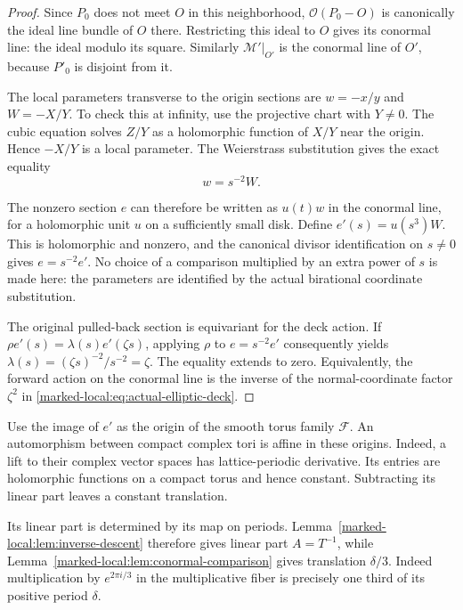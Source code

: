 \begin{proof}
Since $P_0$ does not meet $O$ in this neighborhood,
$\mathcal O(P_0-O)$ is canonically the ideal line bundle of $O$
there. Restricting this ideal to $O$ gives its conormal line:
the ideal modulo its square. Similarly $\mathcal M'|_{O'}$ is
the conormal line of $O'$, because $P'_0$ is disjoint from it.

The local parameters transverse to the origin sections are
$w=-x/y$ and $W=-X/Y$. To check this at infinity, use the projective chart with $Y\ne0$.
The cubic equation solves $Z/Y$ as a holomorphic function of $X/Y$
near the origin. Hence $-X/Y$ is a local parameter. The Weierstrass substitution gives the
exact equality
\begin{equation}\label{marked-local:eq:conormal-coordinate}
                         w=s^{-2}W.
\end{equation}

The nonzero section $e$ can therefore be written as $u(t)w$ in
the conormal line, for a holomorphic unit $u$ on a sufficiently
small disk. Define $e'(s)=u(s^3)W$. This is holomorphic and
nonzero, and the canonical divisor identification on $s\ne0$
gives $e=s^{-2}e'$. No choice of a comparison multiplied by an
extra power of $s$ is made here: the parameters are identified
by the actual birational coordinate substitution.

The original pulled-back section is equivariant for the deck
action. If $\rho e'(s)=\lambda(s)e'(\zeta s)$, applying $\rho$
to $e=s^{-2}e'$ consequently yields
$\lambda(s)=(\zeta s)^{-2}/s^{-2}=\zeta$.
The equality extends to zero. Equivalently, the forward action on
the conormal line is the inverse of the normal-coordinate factor
$\zeta^2$ in \eqref{marked-local:eq:actual-elliptic-deck}.
\end{proof}

Use the image of $e'$ as the origin of the smooth torus family
$\mathcal F$. An automorphism between compact complex tori is affine in these origins.
Indeed, a lift to their complex vector spaces has lattice-periodic derivative.
Its entries are holomorphic functions on a compact torus and hence constant. Subtracting its
linear part leaves a constant translation.

Its linear part is
determined by its map on periods. Lemma~\ref{marked-local:lem:inverse-descent}
therefore gives linear part $A=T^{-1}$, while
Lemma~\ref{marked-local:lem:conormal-comparison} gives translation $\delta/3$.
Indeed multiplication by $e^{2\pi i/3}$ in the multiplicative
fiber is precisely one third of its positive period $\delta$.


